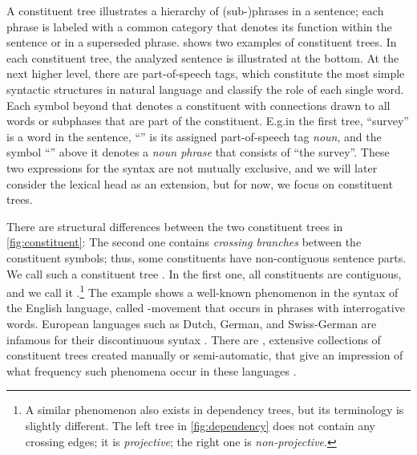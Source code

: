 \documentclass[../document.tex]{subfiles}
\begin{document}
    A constituent tree illustrates a hierarchy of (sub-)phrases in a sentence; each phrase is labeled with a common category that denotes its function within the sentence or in a superseded phrase.
     shows two examples of constituent trees.
    In each constituent tree, the analyzed sentence is illustrated at the bottom.
    At the next higher level, there are part-of-speech tags, which constitute the most simple syntactic structures in natural language and classify the role of each single word.
    Each symbol beyond that denotes a constituent with connections drawn to all words or subphases that are part of the constituent.
    E.g.\@ in the first tree, ``survey'' is a word in the sentence, ``'' is its assigned part-of-speech tag \emph{noun}, and the symbol ``'' above it denotes a \emph{noun phrase} that consists of ``the survey''.
    These two expressions for the syntax are not mutually exclusive, and we will later consider the lexical head as an extension, but for now, we focus on constituent trees.

    There are structural differences between the two constituent trees in \cref{fig:constituent}:
        The second one contains \emph{crossing branches} between the constituent symbols; thus, some constituents have non-contiguous sentence parts.
    We call such a constituent tree .
    In the first one, all constituents are contiguous, and we call it .\footnote{
        A similar phenomenon also exists in dependency trees, but its terminology is slightly different.
        The left tree in \cref{fig:dependency} does not contain any crossing edges; it is \emph{projective}; the right one is \emph{non-projective}.
    }
    The example shows a well-known phenomenon in the syntax of the English language, called -movement that occurs in phrases with interrogative words.
    European languages such as Dutch, German, and Swiss-German are infamous for their discontinuous syntax \citep{Shieber85,Becker91}.
    There are , extensive collections of constituent trees created manually or semi-automatic, that give an impression of what frequency such phenomena occur in these languages \citep{Marcus94,EvaKal11,Skut98,Brants04,Noo13}.
\end{document}
